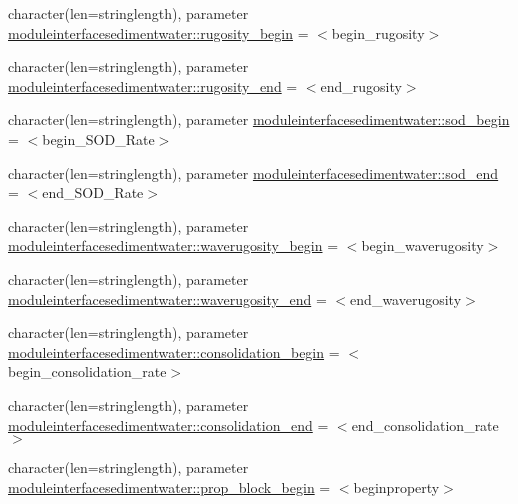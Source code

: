 \begin{DoxyCompactItemize}
\item 
character(len=stringlength), parameter \mbox{\hyperlink{namespacemoduleinterfacesedimentwater_af85e95b969ff985f2fefcabb3ac4782c}{moduleinterfacesedimentwater\+::rugosity\+\_\+begin}} = \textquotesingle{}$<$begin\+\_\+rugosity$>$\textquotesingle{}
\item 
character(len=stringlength), parameter \mbox{\hyperlink{namespacemoduleinterfacesedimentwater_a37d7fe80d43f9e36fa72e670b7f99661}{moduleinterfacesedimentwater\+::rugosity\+\_\+end}} = \textquotesingle{}$<$end\+\_\+rugosity$>$\textquotesingle{}
\item 
character(len=stringlength), parameter \mbox{\hyperlink{namespacemoduleinterfacesedimentwater_ae7ff52be4d3debefd5ba655c95bc515c}{moduleinterfacesedimentwater\+::sod\+\_\+begin}} = \textquotesingle{}$<$begin\+\_\+\+S\+O\+D\+\_\+\+Rate$>$\textquotesingle{}
\item 
character(len=stringlength), parameter \mbox{\hyperlink{namespacemoduleinterfacesedimentwater_a2391be2a5f13e4a8faaaa7d0ceb67473}{moduleinterfacesedimentwater\+::sod\+\_\+end}} = \textquotesingle{}$<$end\+\_\+\+S\+O\+D\+\_\+\+Rate$>$\textquotesingle{}
\item 
character(len=stringlength), parameter \mbox{\hyperlink{namespacemoduleinterfacesedimentwater_ae6bb00c8980ce7d2e0f3599df39e525f}{moduleinterfacesedimentwater\+::waverugosity\+\_\+begin}} = \textquotesingle{}$<$begin\+\_\+waverugosity$>$\textquotesingle{}
\item 
character(len=stringlength), parameter \mbox{\hyperlink{namespacemoduleinterfacesedimentwater_a42061fb11ef02654e183649e5e48dc1b}{moduleinterfacesedimentwater\+::waverugosity\+\_\+end}} = \textquotesingle{}$<$end\+\_\+waverugosity$>$\textquotesingle{}
\item 
character(len=stringlength), parameter \mbox{\hyperlink{namespacemoduleinterfacesedimentwater_a1dcccf67e2359074afcdf0aa1e69f308}{moduleinterfacesedimentwater\+::consolidation\+\_\+begin}} = \textquotesingle{}$<$begin\+\_\+consolidation\+\_\+rate$>$\textquotesingle{}
\item 
character(len=stringlength), parameter \mbox{\hyperlink{namespacemoduleinterfacesedimentwater_a7ae3568b82a4f70849648975b65d7dfc}{moduleinterfacesedimentwater\+::consolidation\+\_\+end}} = \textquotesingle{}$<$end\+\_\+consolidation\+\_\+rate$>$\textquotesingle{}
\item 
character(len=stringlength), parameter \mbox{\hyperlink{namespacemoduleinterfacesedimentwater_a544c3414c82d7e0289f216d5ad6c7299}{moduleinterfacesedimentwater\+::prop\+\_\+block\+\_\+begin}} = \textquotesingle{}$<$beginproperty$>$\textquotesingle{}

\end{DoxyCompactItemize}
